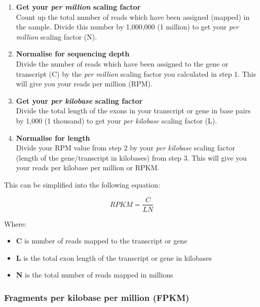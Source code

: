 \documentclass[11pt]{article}
\providecommand{\tightlist}{%
      \setlength{\itemsep}{0pt}\setlength{\parskip}{0pt}}
\begin{document}
\begin{enumerate}
\def\labelenumi{\arabic{enumi}.}
\item
  \textbf{Get your \textit{per million} scaling factor}\\
  Count up the total number of reads which have been assigned (mapped)
  in the sample. Divide this number by 1,000,000 (1 million) to get your
  \textit{per million} scaling factor (N).
\item
  \textbf{Normalise for sequencing depth}\\
  Divide the number of reads which have been assigned to the gene or
  transcript (C) by the \textit{per million} scaling factor you calculated
  in step 1. This will give you your reads per million (RPM).
\item
  \textbf{Get your \textit{per kilobase} scaling factor}\\
  Divide the total length of the exons in your transcript or gene in
  base pairs by 1,000 (1 thousand) to get your \textit{per kilobase}
  scaling factor (L).
\item
  \textbf{Normalise for length}\\
  Divide your RPM value from step 2 by your \textit{per kilobase} scaling
  factor (length of the gene/transcript in kilobases) from step 3. This
  will give you your reads per kilobase per million or RPKM.
\end{enumerate}

This can be simplified into the following equation:

\begin{equation*}
RPKM = \frac {C}{LN}
\end{equation*}

Where:

\begin{itemize}
\tightlist
\item
  \textbf{C} is number of reads mapped to the transcript or gene
\item
  \textbf{L} is the total exon length of the transcript or gene in
  kilobases
\item
  \textbf{N} is the total number of reads mapped in millions
\end{itemize}

    \hypertarget{fragments-per-kilobase-per-million-fpkm}{%
\subsubsection{Fragments per kilobase per million
(FPKM)}\label{fragments-per-kilobase-per-million-fpkm}}
\end{document}
